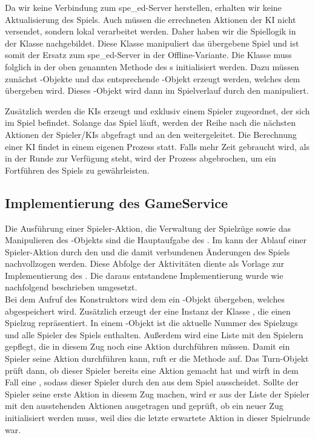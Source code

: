 Da wir keine Verbindung zum spe\_ed-Server herstellen, erhalten wir keine Aktualisierung des Spiels.
Auch müssen die errechneten Aktionen der \ac{KI} nicht versendet, sondern lokal verarbeitet werden.
Daher haben wir die Spiellogik in der Klasse  nachgebildet.
Diese Klasse manipuliert das übergebene Spiel und ist somit der Ersatz zum spe\_ed-Server in der Offline-Variante.
Die Klasse  muss folglich in der oben genannten Methode  des s
initialisiert werden.
Dazu müssen zunächst -Objekte und das entsprechende -Objekt erzeugt werden, welches dem
 übergeben wird.
Dieses -Objekt wird dann im Spielverlauf durch den  manipuliert.

Zusätzlich werden die \ac{KI}s erzeugt und exklusiv einem Spieler zugeordnet, der sich im Spiel befindet.
Solange das Spiel läuft, werden der Reihe nach die nächsten Aktionen der
Spieler/\ac{KI}s abgefragt und an den  weitergeleitet.
Die Berechnung einer \ac{KI} findet in einem eigenen Prozess statt.
Falls mehr Zeit gebraucht wird, als in der Runde zur Verfügung steht, wird der Prozess abgebrochen, um ein
Fortführen des Spiels zu gewährleisten.

\subsection{Implementierung des GameService}
\label{subsec:game-service}

Die Ausführung einer Spieler-Aktion, die Verwaltung der Spielzüge sowie das Manipulieren des -Objekts sind
die Hauptaufgabe des .
Im  kann der Ablauf einer Spieler-Aktion durch den
 und die damit verbundenen Änderungen des Spiels nachvollzogen werden.
Diese Abfolge der Aktivitäten diente als Vorlage zur Implementierung des .
Die daraus entstandene Implementierung wurde wie nachfolgend beschrieben umgesetzt. \\

Bei dem Aufruf des Konstruktors wird dem  ein -Objekt übergeben, welches abgespeichert
wird.
Zusätzlich erzeugt der  eine Instanz der Klasse , die einen Spielzug repräsentiert.
In einem -Objekt ist die aktuelle Nummer des Spielzugs und alle Spieler des Spiels enthalten.
Außerdem wird eine Liste mit den Spielern gepflegt, die in diesem Zug noch eine Aktion durchführen müssen.
Damit ein Spieler seine Aktion durchführen kann, ruft er die Methode  auf.
Das Turn-Objekt prüft dann, ob dieser Spieler bereits eine Aktion gemacht hat und wirft in dem Fall eine
, sodass dieser Spieler durch den  aus dem Spiel ausscheidet.
Sollte der Spieler seine erste Aktion in diesem Zug machen, wird er aus der Liste der Spieler mit den ausstehenden
Aktionen ausgetragen und geprüft, ob ein neuer Zug initialisiert werden muss, weil dies die letzte erwartete Aktion
in dieser Spielrunde war. \\


